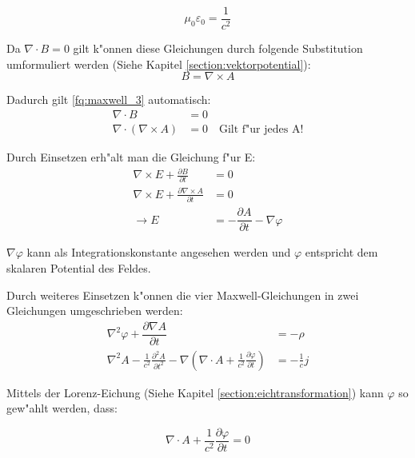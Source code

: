 \begin{equation*}
\mu_0\varepsilon_0=\frac{1}{c^2}
\end{equation*}

Da $\nabla \cdot B = 0 $ gilt k"onnen diese Gleichungen durch folgende Substitution umformuliert werden (Siehe Kapitel \ref{section:vektorpotential}):
\begin{equation*}
B = \nabla\times A 
\end{equation*}

Dadurch gilt \ref{fq:maxwell_3} automatisch:
\begin{equation*}
\begin{split}
\nabla \cdot B &= 0 \\
\nabla \cdot ( \nabla\times A ) &= 0 \quad \text{Gilt f"ur jedes A!}
\end{split}
\end{equation*}

Durch Einsetzen erh"alt man die Gleichung f"ur E:
\begin{equation*}
\begin{split}
\nabla\times E + \frac{\partial B }{\partial t} &= 0 \\
\nabla\times E + \frac{\partial \nabla\times A }{\partial t} &= 0 \\
\rightarrow E &= -\dfrac{\partial A}{\partial t} - \nabla \varphi
\end{split}
\end{equation*}

$\nabla \varphi$ kann als Integrationskonstante angesehen werden und $\varphi$ entspricht dem skalaren Potential des Feldes.

Durch weiteres Einsetzen k"onnen die vier Maxwell-Gleichungen in zwei Gleichungen umgeschrieben werden:
\begin{align} 
 \label{fq:a_coupled_a}
 \nabla^2 \varphi + \dfrac{\partial \nabla A}{\partial t} &= -\rho \\
 \label{fq:a_coupled_b}
 \nabla^2 A - \frac{1}{c^2} \frac{\partial^2 A }{\partial t^2} - \nabla \left( \nabla \cdot A + \frac{1}{c^2} \frac{\partial \varphi }{\partial t} \right) &= - \frac{1}{c} j
\end{align}

Mittels der Lorenz-Eichung (Siehe Kapitel \ref{section:eichtransformation}) kann $\varphi$ so gew"ahlt werden, dass:

\begin{equation} \label{fq:lorenz_eq}
\nabla \cdot A + \frac{1}{c^2} \frac{\partial \varphi }{\partial t} = 0
\end{equation}

